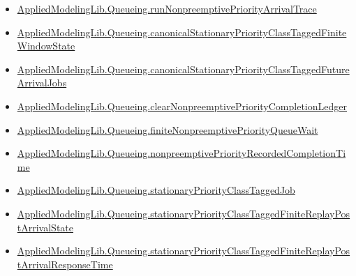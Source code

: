\documentclass[10pt]{article}
\begin{document}
\begin{itemize}[leftmargin=1.2em]
\begin{itemize}[leftmargin=1.2em]
\item \hyperlink{library-prerequisite-74e6067041d9c8dc}{Applied\allowbreak{}Modeling\allowbreak{}Lib.\allowbreak{}Queueing.\allowbreak{}run\allowbreak{}Nonpreemptive\allowbreak{}Priority\allowbreak{}Arrival\allowbreak{}Trace}
\item \hyperlink{library-prerequisite-6e4e64d50452f911}{Applied\allowbreak{}Modeling\allowbreak{}Lib.\allowbreak{}Queueing.\allowbreak{}canonical\allowbreak{}Stationary\allowbreak{}Priority\allowbreak{}Class\allowbreak{}Tagged\allowbreak{}Finite\allowbreak{}Window\allowbreak{}State}
\item \hyperlink{library-prerequisite-bb4b8c8010d5959b}{Applied\allowbreak{}Modeling\allowbreak{}Lib.\allowbreak{}Queueing.\allowbreak{}canonical\allowbreak{}Stationary\allowbreak{}Priority\allowbreak{}Class\allowbreak{}Tagged\allowbreak{}Future\allowbreak{}Arrival\allowbreak{}Jobs}
\item \hyperlink{library-prerequisite-cc744f6520cc7734}{Applied\allowbreak{}Modeling\allowbreak{}Lib.\allowbreak{}Queueing.\allowbreak{}clear\allowbreak{}Nonpreemptive\allowbreak{}Priority\allowbreak{}Completion\allowbreak{}Ledger}
\item \hyperlink{library-prerequisite-795b7af1c661bc8d}{Applied\allowbreak{}Modeling\allowbreak{}Lib.\allowbreak{}Queueing.\allowbreak{}finite\allowbreak{}Nonpreemptive\allowbreak{}Priority\allowbreak{}Queue\allowbreak{}Wait}
\item \hyperlink{library-prerequisite-886cbd948a5fd8b1}{Applied\allowbreak{}Modeling\allowbreak{}Lib.\allowbreak{}Queueing.\allowbreak{}nonpreemptive\allowbreak{}Priority\allowbreak{}Recorded\allowbreak{}Completion\allowbreak{}Time}
\item \hyperlink{library-prerequisite-3702583c174721c0}{Applied\allowbreak{}Modeling\allowbreak{}Lib.\allowbreak{}Queueing.\allowbreak{}stationary\allowbreak{}Priority\allowbreak{}Class\allowbreak{}Tagged\allowbreak{}Job}
\item \hyperlink{library-prerequisite-098447dd1f7443fd}{Applied\allowbreak{}Modeling\allowbreak{}Lib.\allowbreak{}Queueing.\allowbreak{}stationary\allowbreak{}Priority\allowbreak{}Class\allowbreak{}Tagged\allowbreak{}Finite\allowbreak{}Replay\allowbreak{}Post\allowbreak{}Arrival\allowbreak{}State}
\item \hyperlink{library-prerequisite-945b0f6ad93a6ca5}{Applied\allowbreak{}Modeling\allowbreak{}Lib.\allowbreak{}Queueing.\allowbreak{}stationary\allowbreak{}Priority\allowbreak{}Class\allowbreak{}Tagged\allowbreak{}Finite\allowbreak{}Replay\allowbreak{}Post\allowbreak{}Arrival\allowbreak{}Response\allowbreak{}Time}

\end{itemize}
\end{itemize}
\end{document}
